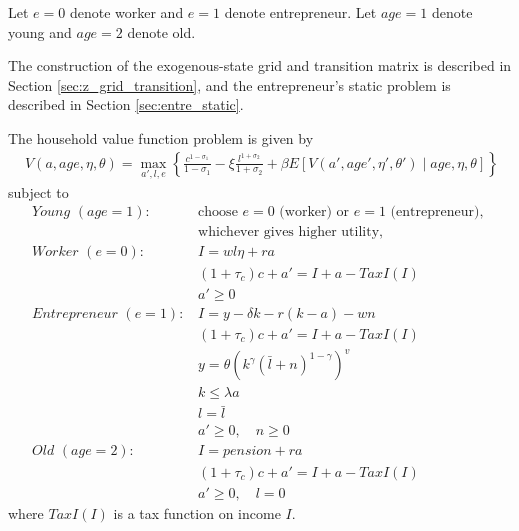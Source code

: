 \documentclass[11pt,fleqn]{article}
\begin{document}
Let $e=0$ denote worker and $e=1$ denote entrepreneur. Let $age=1$ denote young and $age=2$ denote old.

The construction of the exogenous-state grid and transition matrix is described in Section \ref{sec:z_grid_transition}, and the entrepreneur's static problem is described in Section \ref{sec:entre_static}.

The household value function problem is given by
\begin{align*}
\;V(a,age,\eta,\theta)=\max_{a',l,e} \left\{\frac{c^{1-\sigma_1}}{1-\sigma_1}
 - \xi \frac{l^{1+\sigma_2}}{1+\sigma_2}
 + \beta E\!\left[V(a',age',\eta',\theta') \mid age,\eta,\theta\right]\right\}
\end{align*}
subject to
\begin{align*}
\textit{Young $(age=1)$:} \; & \text{choose $e=0$ (worker) or $e=1$ (entrepreneur), }  \\
                             & \text{whichever gives higher utility,} \\
 \textit{Worker $(e=0)$:} \; & I = w l \eta + r a \\
                             & (1+\tau_c)c + a' = I + a - TaxI(I) \\
                             & a' \geq 0  \\
 \textit{Entrepreneur $(e=1)$:} \; & I = y - \delta k - r(k-a) - w n \\
                                   & (1+\tau_c)c + a' = I + a - TaxI(I) \\
                                   & y = \theta \left(k^{\gamma} (\bar{l}+n)^{1-\gamma}\right)^{v} \\
                                   & k \leq \lambda a \\
                                   & l = \bar{l} \\
								   & a' \geq 0, \quad n \geq 0 \\
  \textit{Old $(age=2)$:} \; & I = pension + r a \\
                             & (1+\tau_c)c + a' = I + a - TaxI(I) \\
                             & a' \geq 0,\quad l = 0
\end{align*}
where $TaxI(I)$ is a tax function on income $I$.
\end{document}
